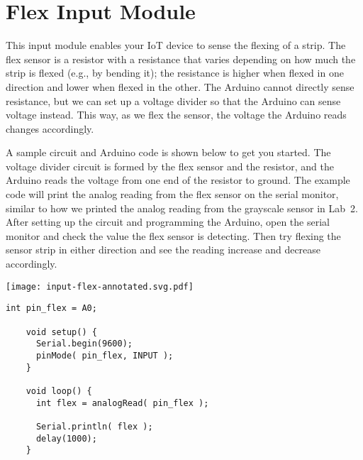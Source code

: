 
\clearpage
\section{Flex Input Module}
\label{sec-input-flex}

This input module enables your IoT device to sense the flexing of a
 strip. The flex sensor is a resistor with a resistance that
varies depending on how much the strip is flexed (e.g., by bending it);
the resistance is higher when flexed in one direction and lower when
flexed in the other. The Arduino cannot directly sense resistance, but
we can set up a voltage divider so that the Arduino can sense voltage
instead. This way, as we flex the sensor, the voltage the Arduino reads
changes accordingly.


A sample circuit and Arduino code is shown below to get you started.
The voltage divider circuit is formed by the flex sensor and the
 resistor, and the Arduino reads the voltage from one end
of the resistor to ground. The example code will print the analog
reading from the flex sensor on the serial monitor, similar to how we
printed the analog reading from the grayscale sensor in Lab~2. After
setting up the circuit and programming the Arduino, open the serial
monitor and check the value the flex sensor is detecting. Then try
flexing the sensor strip in either direction and see the reading
increase and decrease accordingly.

\vspace{0.1in}
\begin{minipage}[t]{0.49\tw}
  \vspace{0pt}

  \texttt{[image: input-flex-annotated.svg.pdf]}
\end{minipage}
\hfill
\begin{minipage}[t]{0.49\tw}
  \vspace{0.1in}
  \begin{Verbatim}[gobble=3,fontsize=\small]
    int pin_flex = A0;

    void setup() {
      Serial.begin(9600);
      pinMode( pin_flex, INPUT );
    }

    void loop() {
      int flex = analogRead( pin_flex );

      Serial.println( flex );
      delay(1000);
    }
  \end{Verbatim}
\end{minipage}
\vspace{0.1in}

